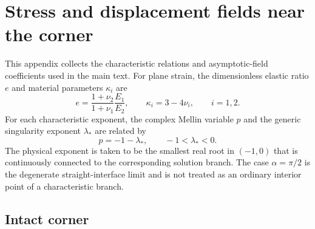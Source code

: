 \section{Stress and displacement fields near the corner}
\label{app:asymptotics}
\providecommand{\SingularityExponentFigure}{Figure~\ref{fig:singularity-exponents}}

\setcounter{equation}{0}
\renewcommand{\theequation}{A.\arabic{equation}}

This appendix collects the characteristic relations and asymptotic-field
coefficients used in the main text. For plane strain, the dimensionless
elastic ratio $e$ and material parameters $\kappa_i$ are
\begin{equation*}
  e=\frac{1+\nu_2}{1+\nu_1}\frac{E_1}{E_2},
  \qquad
  \kappa_i=3-4\nu_i,\qquad i=1,2.
\end{equation*}
For each characteristic exponent, the complex Mellin variable $p$ and
the generic singularity exponent $\lambda_*$ are related by
\begin{equation*}
  p=-1-\lambda_*,
  \qquad -1<\lambda_*<0.
\end{equation*}
The physical exponent is taken to be the smallest real root in
$(-1,0)$ that is continuously connected to the corresponding solution
branch. The case $\alpha=\pi/2$ is the degenerate straight-interface
limit and is not treated as an ordinary interior point of a
characteristic branch.

\subsection{Intact corner}

